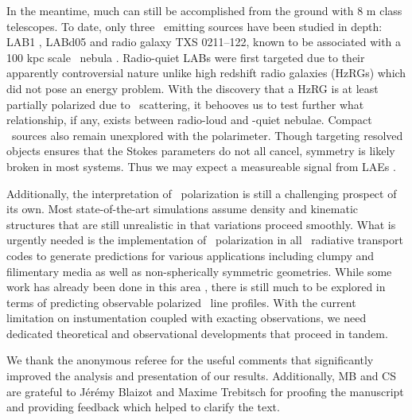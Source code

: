 In the meantime, much can still be accomplished from the ground with 8 m class telescopes. To date, only three \lya~emitting sources have been studied in depth: LAB1 \citep[][and this work]{HayesScarlata2011}, LABd05 \citep{Prescott2011} and radio galaxy TXS 0211--122, known to be associated with a 100 kpc scale \lya~nebula \citep{Humphrey2013}. Radio-quiet LABs were first targeted due to their apparently controversial nature unlike high redshift radio galaxies (HzRGs) which did not pose an energy problem.  With the discovery that a HzRG is at least partially polarized due to \lya~scattering, it behooves us to test further what relationship, if any, exists between radio-loud and -quiet nebulae. Compact \lya~sources also remain unexplored with the polarimeter. Though targeting resolved objects ensures that the Stokes parameters do not all cancel, symmetry is likely broken in most systems. Thus we may expect a measureable signal from LAEs \citep{LeeAhn1998}.
 
Additionally, the interpretation of \lya~polarization is still a challenging prospect of its own. Most state-of-the-art simulations assume density and kinematic structures that are still unrealistic in that variations proceed smoothly. What is urgently needed is the implementation of \lya~polarization in all \lya~radiative transport codes to generate predictions for various applications including clumpy and filimentary media as well as non-spherically symmetric geometries. While some work has already been done in this area \citep{DijkstraKramer2012}, there is still much to be explored in terms of predicting observable polarized \lya~line profiles. With the current limitation on instumentation coupled with exacting observations, we need dedicated theoretical and observational developments that proceed in tandem. 
\newline

We thank the anonymous referee for the useful comments that significantly improved the analysis and presentation of our results. Additionally, MB and CS are grateful to J\'{e}r\'{e}my Blaizot and Maxime Trebitsch for proofing the manuscript and providing feedback which helped to clarify the text. 